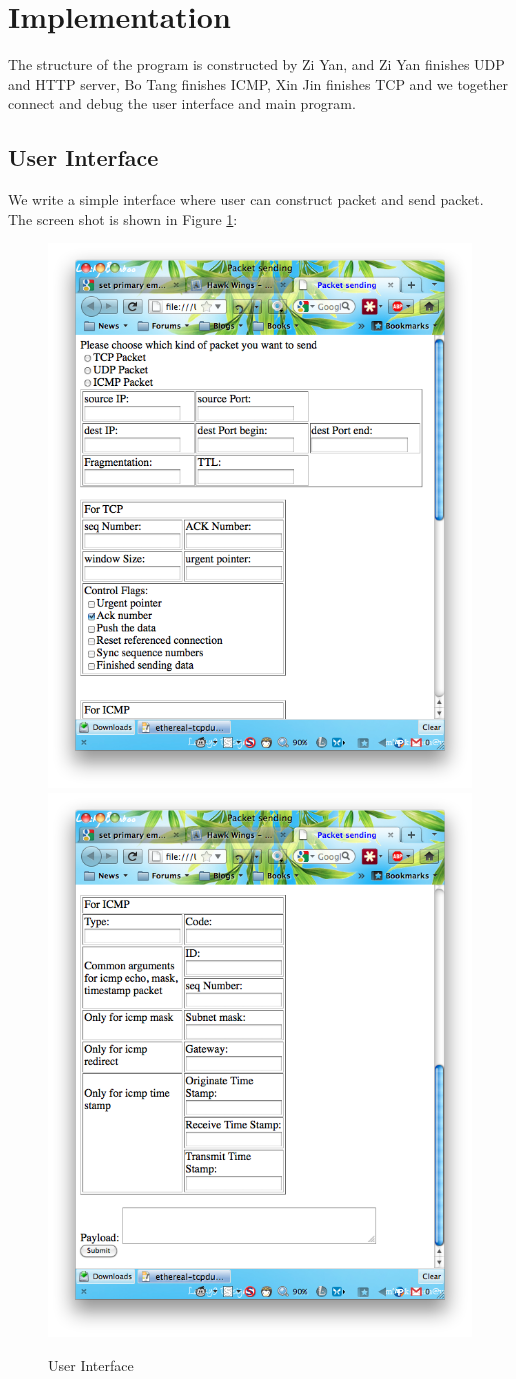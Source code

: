 \documentclass[12pt,letterpaper]{report}
\begin{document}
\chapter*{Implementation}
The structure of the program is constructed by Zi Yan, and 
Zi Yan finishes UDP and HTTP server, Bo Tang finishes ICMP, 
Xin Jin finishes TCP and we together connect and debug the 
user interface and main program. 

\section*{User Interface}
We write a simple interface where user can construct packet 
and send packet. The screen shot is shown in Figure \ref{ui}:

\begin{figure}[!htp]
\includegraphics[width=0.5\linewidth]{ui1.png}
\includegraphics[width=0.5\linewidth]{ui2.png}
\caption{User Interface}
\label{ui}
\end{figure}
\end{document}
